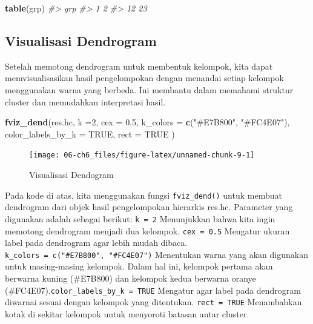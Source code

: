 \documentclass[
  oneside]{book}
\newenvironment{Shaded}{\begin{snugshade}}{\end{snugshade}}
\newcommand{\AttributeTok}[1]{\textcolor[rgb]{0.13,0.29,0.53}{#1}}
\newcommand{\CommentTok}[1]{\textcolor[rgb]{0.56,0.35,0.01}{\textit{#1}}}
\newcommand{\ConstantTok}[1]{\textcolor[rgb]{0.56,0.35,0.01}{#1}}
\newcommand{\DecValTok}[1]{\textcolor[rgb]{0.00,0.00,0.81}{#1}}
\newcommand{\FloatTok}[1]{\textcolor[rgb]{0.00,0.00,0.81}{#1}}
\newcommand{\FunctionTok}[1]{\textcolor[rgb]{0.13,0.29,0.53}{\textbf{#1}}}
\newcommand{\NormalTok}[1]{#1}
\newcommand{\StringTok}[1]{\textcolor[rgb]{0.31,0.60,0.02}{#1}}
\begin{document}
\begin{Shaded}
\begin{Highlighting}[]
\FunctionTok{table}\NormalTok{(grp)}
\CommentTok{\#\textgreater{} grp}
\CommentTok{\#\textgreater{}  1  2 }
\CommentTok{\#\textgreater{} 12 23}
\end{Highlighting}
\end{Shaded}

\subsection*{Visualisasi Dendrogram}\label{visualisasi-dendrogram}

Setelah memotong dendrogram untuk membentuk kelompok, kita dapat memvisualisasikan hasil pengelompokan dengan menandai setiap kelompok menggunakan warna yang berbeda. Ini membantu dalam memahami struktur cluster dan memudahkan interpretasi hasil.

\begin{Shaded}
\begin{Highlighting}[]
\FunctionTok{fviz\_dend}\NormalTok{(res.hc, }\AttributeTok{k =}\DecValTok{2}\NormalTok{, }
          \AttributeTok{cex =} \FloatTok{0.5}\NormalTok{, }
          \AttributeTok{k\_colors =} \FunctionTok{c}\NormalTok{(}\StringTok{"\#E7B800"}\NormalTok{, }\StringTok{"\#FC4E07"}\NormalTok{),}
          \AttributeTok{color\_labels\_by\_k =} \ConstantTok{TRUE}\NormalTok{, }
          \AttributeTok{rect =} \ConstantTok{TRUE} 
\NormalTok{          )}
\end{Highlighting}
\end{Shaded}

\begin{figure}[h]

{\centering \texttt{[image: 06-ch6\_files/figure-latex/unnamed-chunk-9-1]} 

}

\caption{Visualisasi Dendogram}\label{fig:unnamed-chunk-9}
\end{figure}

Pada kode di atas, kita menggunakan fungsi \texttt{fviz\_dend()} untuk membuat dendrogram dari objek hasil pengelompokan hierarkis res.hc. Parameter yang digunakan adalah sebagai berikut: \texttt{k\ =\ 2} Menunjukkan bahwa kita ingin memotong dendrogram menjadi dua kelompok. \texttt{cex\ =\ 0.5} Mengatur ukuran label pada dendrogram agar lebih mudah dibaca. \texttt{k\_colors\ =\ c("\#E7B800",\ "\#FC4E07")} Menentukan warna yang akan digunakan untuk masing-masing kelompok. Dalam hal ini, kelompok pertama akan berwarna kuning (\#E7B800) dan kelompok kedua berwarna oranye (\#FC4E07).\texttt{color\_labels\_by\_k\ =\ TRUE} Mengatur agar label pada dendrogram diwarnai sesuai dengan kelompok yang ditentukan. \texttt{rect\ =\ TRUE} Menambahkan kotak di sekitar kelompok untuk menyoroti batasan antar cluster.
\end{document}
